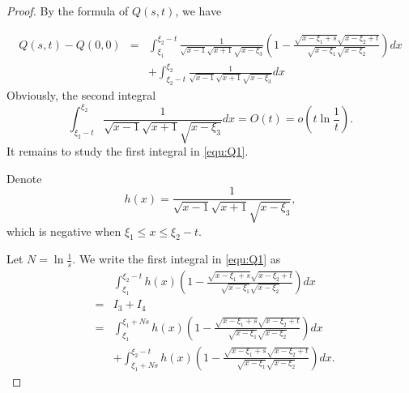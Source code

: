 \documentclass[11pt]{amsart}
\theoremstyle{plain}
\begin{document}
\begin{proof} By the formula of $Q(s,t)$, we have 

\begin{eqnarray}\label{equ:Q1}
Q(s,t)-Q(0,0)&=&\int_{\xi_1}^{\xi_2-t}\frac{1}{\sqrt{x-1}\sqrt{x+1}\sqrt{x-\xi_3}}
\left(1-\frac{\sqrt{x-\xi_1+s}\sqrt{x-\xi_2+t}}{\sqrt{x-\xi_1}\sqrt{x-\xi_2}}\right)dx  \nonumber \\ 
&& +\int_{\xi_2-t}^{\xi_2}\frac{1}{\sqrt{x-1}\sqrt{x+1}\sqrt{x-\xi_3}}dx
\end{eqnarray}
Obviously, the second integral
 $$\int_{\xi_2-t}^{\xi_2}\frac{1}{\sqrt{x-1}\sqrt{x+1}\sqrt{x-\xi_3}}dx=O(t)=o\left(t \ln \frac{1}{t}\right).$$ 
It remains to study the first integral in \eqref{equ:Q1}.
 

 
Denote $$h(x)=\frac{1}{\sqrt{x-1}\sqrt{x+1}\sqrt{x-\xi_3}},$$ 
which is negative when $\xi_1\leq x\leq \xi_2-t$. 


Let $N=\ln \frac{1}{s}$. We write the first integral in \eqref{equ:Q1} as
\begin{eqnarray}\label{equ:Q2}
 && \int_{\xi_1}^{\xi_2-t} h(x) \left(1-\frac{\sqrt{x-\xi_1+s}\sqrt{x-\xi_2+t}}{\sqrt{x-\xi_1}\sqrt{x-\xi_2}}\right)dx  \\
&=&  I_3+I_4 \nonumber \\
&=& \int_{\xi_1}^{\xi_1+Ns} h(x)\left(1-\frac{\sqrt{x-\xi_1+s}\sqrt{x-\xi_2+t}}{\sqrt{x-\xi_1}\sqrt{x-\xi_2}}\right)dx \nonumber \\ &&+\int_{\xi_1+Ns}^{\xi_2-t} h(x)\left(1-\frac{\sqrt{x-\xi_1+s}\sqrt{x-\xi_2+t}}{\sqrt{x-\xi_1}\sqrt{x-\xi_2}}\right)dx. \nonumber
\end{eqnarray}


\end{proof}
\end{document}
